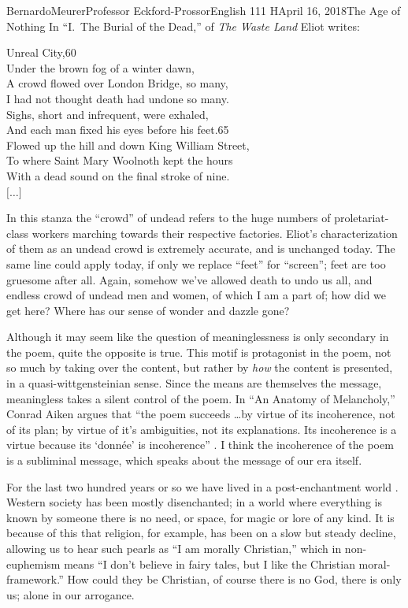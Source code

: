 \documentclass[12pt,letterpaper]{article}
\begin{document}
\begin{mla}{Bernardo}{Meurer}{Professor Eckford-Prossor}{English 111 H}{April 16, 2018}{The Age of Nothing}
    In ``I.~The Burial of the Dead,'' of \textit{The Waste Land} Eliot writes:
    \begin{blocks}
        Unreal City,\hfill 60\\
        Under the brown fog of a winter dawn,\\
        A crowd flowed over London Bridge, so many,\\
        I had not thought death had undone so many.\\
        Sighs, short and infrequent, were exhaled,\\
        And each man fixed his eyes before his feet.\hfill 65\\
        Flowed up the hill and down King William Street,\\
        To where Saint Mary Woolnoth kept the hours\\
        With a dead sound on the final stroke of nine.\\
        \(\lbrack\ldots\rbrack \)\hfill \autocite[7]{eliot_2001}
    \end{blocks}
    In this stanza the ``crowd'' of undead refers to the huge numbers of proletariat-class workers marching towards their respective factories. Eliot's characterization of them as an undead crowd is extremely accurate, and is unchanged today. The same line could apply today, if only we replace ``feet'' for ``screen''; feet are too gruesome after all. Again, somehow we've allowed death to undo us all, and endless crowd of undead men and women, of which I am a part of; how did we get here? Where has our sense of wonder and dazzle gone?

    Although it may seem like the question of meaninglessness is only secondary in the poem, quite the opposite is true. This motif is protagonist in the poem, not so much by taking over the content, but rather by \emph{how} the content is presented, in a quasi-wittgensteinian sense. Since the means are themselves the message, meaningless takes a silent control of the poem.
    In ``An Anatomy of Melancholy,'' Conrad Aiken argues that ``the poem succeeds \ldots by virtue of its incoherence, not of its plan; by virtue of it's ambiguities, not its explanations. Its incoherence is a virtue because its `donnée' is incoherence'' \autocite[Eliot 152]{eliot_2001}. I think the incoherence of the poem is a subliminal message, which speaks about the message of our era itself.

    For the last two hundred years or so we have lived in a post-enchantment world \autocite[12]{jenkins_2012}. Western society has been mostly disenchanted; in a world where everything is known by someone there is no need, or space, for magic or lore of any kind. It is because of this that religion, for example, has been on a slow but steady decline, allowing us to hear such pearls as ``I am morally Christian,'' which in non-euphemism means ``I don't believe in fairy tales, but I like the Christian moral-framework.'' How could they be Christian, of course there is no God, there is only us; alone in our arrogance.


\end{mla}
\end{document}
